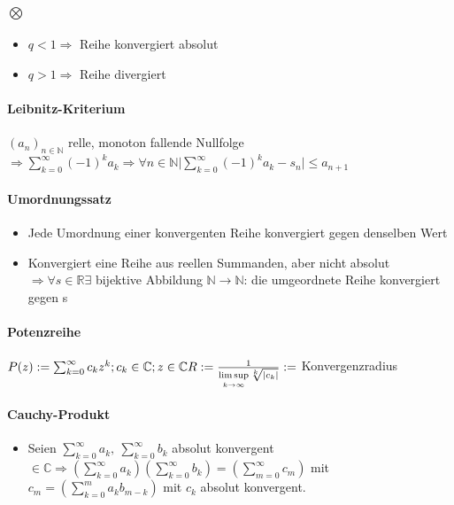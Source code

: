 \documentclass[paper=a3,paper=landscape, fontsize=9pt, DIV=30]{scrartcl}
\newcommand{\real}{{\mathbb{R}}}
\newcommand{\compl}{\mathbb{C}}
\newcommand{\nat}{\mathbb{N}}
\newcommand{\aseq}{(a_n)_{n \in \nat}}
\begin{document}
\begin{multicols*}{4}
  \paragraph{$\bigotimes$}
  \begin{itemize}
  \item $q < 1 \Rightarrow$ Reihe konvergiert absolut
  \item $q > 1 \Rightarrow$ Reihe divergiert
  \end{itemize}

  \paragraph{Leibnitz-Kriterium}
  $\aseq$ relle, monoton fallende Nullfolge $ \Rightarrow \sum_{k=0}^{\infty} (-1)^ka_k \Rightarrow \forall n \in \nat \lvert \sum_{k=0}^{\infty}(-1)^ka_k-s_n \rvert \leq  a_{n+1}$

  \paragraph{Umordnungssatz}\begin{itemize}
  \item Jede Umordnung einer konvergenten Reihe konvergiert gegen denselben Wert
  \item Konvergiert eine Reihe aus reellen Summanden, aber nicht absolut $\Rightarrow \forall s \in \real \exists$ bijektive Abbildung $\nat \rightarrow \nat$: die umgeordnete Reihe konvergiert gegen s
\end{itemize}

  \paragraph{Potenzreihe}
    $ P(z) := \sum_{k=0}^{\infty} c_kz^k; c_k \in \compl; z \in \compl\\R := \frac{1}{\limsup\limits_{k \rightarrow \infty} \sqrt[k]{|c_k|}} :=$ Konvergenzradius


  \paragraph{Cauchy-Produkt}
  \begin{itemize}
  \item Seien $ \sum_{k=0}^{\infty} a_k,\:\sum_{k=0}^{\infty} b_k$ absolut konvergent $ \in \compl \Rightarrow (\sum_{k=0}^{\infty} a_k) (\sum_{k=0}^{\infty} b_k) = (\sum_{m=0}^{\infty} c_m)$ mit $ c_m=(\sum_{k=0}^{m} a_kb_{m-k})$ mit $c_k$ absolut konvergent.


\end{itemize}
\end{multicols*}
\end{document}
